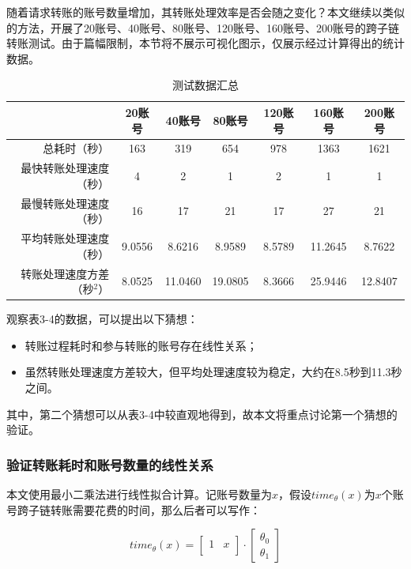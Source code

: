 随着请求转账的账号数量增加，其转账处理效率是否会随之变化？本文继续以类似的方法，开展了20账号、40账号、80账号、120账号、160账号、200账号的跨子链转账测试。由于篇幅限制，本节将不展示可视化图示，仅展示经过计算得出的统计数据。

\begin{table}[htbp]
    \linespread{1.5}
    \centering
    \caption{测试数据汇总}\label{测试数据汇总}
    \begin{tabular}{r|c|c|c|c|c|c} \toprule
                        & 20账号   & 40账号    & 80账号    & 120账号  & 160账号   & 200账号   \\\hline
        总耗时（秒）          & 163    & 319     & 654     & 978    & 1363    & 1621    \\
        最快转账处理速度（秒）     & 4      & 2       & 1       & 2      & 1       & 1       \\
        最慢转账处理速度（秒）     & 16     & 17      & 21      & 17     & 27      & 21      \\
        平均转账处理速度（秒）     & 9.0556 & 8.6216  & 8.9589  & 8.5789 & 11.2645 & 8.7622  \\
        转账处理速度方差（秒$^2$） & 8.0525 & 11.0460 & 19.0805 & 8.3666 & 25.9446 & 12.8407 \\
        \bottomrule
    \end{tabular}
\end{table}

观察表3-4的数据，可以提出以下猜想：
\begin{itemize}
    \item 转账过程耗时和参与转账的账号存在线性关系；
    \item 虽然转账处理速度方差较大，但平均处理速度较为稳定，大约在8.5秒到11.3秒之间。
\end{itemize}

其中，第二个猜想可以从表3-4中较直观地得到，故本文将重点讨论第一个猜想的验证。

\subsubsection{验证转账耗时和账号数量的线性关系}

本文使用最小二乘法进行线性拟合计算。记账号数量为$x$，假设$time_\theta(x)$为$x$个账号跨子链转账需要花费的时间，那么后者可以写作：

$$
    time_\theta(x) =
    \begin{bmatrix}
        1 & x \\
    \end{bmatrix}
    \cdot
    \begin{bmatrix}
        \theta_0 \\
        \theta_1
    \end{bmatrix}
$$

